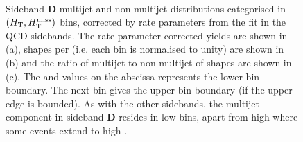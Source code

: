 \begin{figure}[!h]
  \centering
   \\
  \caption{Sideband \textbf{D} multijet and non-multijet distributions
    categorised in $(\mbox{$H_\text{T}$}, \mbox{$H_{\rm T}^{\rm miss}$})$ bins, corrected by rate parameters
    from the fit in the QCD sidebands. The rate parameter corrected yields
    are shown in (a), \HTmiss shapes per \scalht (i.e. each \scalht bin is normalised
    to unity) are shown in (b) and the ratio of multijet to non-multijet of
    \HTmiss shapes are shown in (c). The \scalHT and \HTmiss values on the 
    abscissa represents the lower bin boundary. The next bin gives the upper
    bin boundary (if the upper edge is bounded). As with the other sidebands,
    the multijet component in sideband \textbf{D} resides in low \HTmiss
    bins, apart from high \scalHT where some events extend to high \HTmiss.}
  \label{fig:qcd_mht_shapes_doublesb}
\end{figure}
